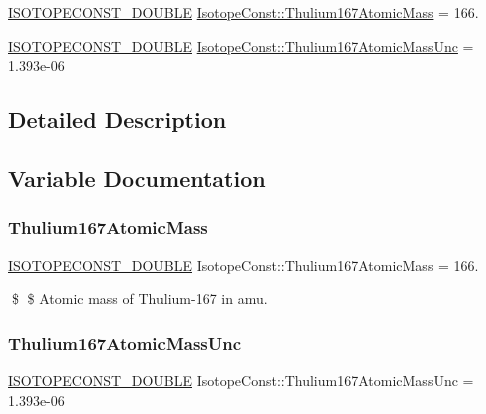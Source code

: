 \begin{DoxyCompactItemize}
\item 
\mbox{\hyperlink{group___isotope_const-_macros_ga8f45a7272ce02c0b4c65c44636ed719a}{I\+S\+O\+T\+O\+P\+E\+C\+O\+N\+S\+T\+\_\+\+D\+O\+U\+B\+LE}} \mbox{\hyperlink{group___isotope_const-_thulium-_tm167_ga1102134452e1325b199676ef048b66ab}{Isotope\+Const\+::\+Thulium167\+Atomic\+Mass}} = 166.
\item 
\mbox{\hyperlink{group___isotope_const-_macros_ga8f45a7272ce02c0b4c65c44636ed719a}{I\+S\+O\+T\+O\+P\+E\+C\+O\+N\+S\+T\+\_\+\+D\+O\+U\+B\+LE}} \mbox{\hyperlink{group___isotope_const-_thulium-_tm167_ga5f30b4ecd3501da8c3ad3e083477f14c}{Isotope\+Const\+::\+Thulium167\+Atomic\+Mass\+Unc}} = 1.\+393e-\/06
\end{DoxyCompactItemize}


\subsection{Detailed Description}


\subsection{Variable Documentation}
\mbox{\label{group___isotope_const-_thulium-_tm167_ga1102134452e1325b199676ef048b66ab}} 
\subsubsection{\texorpdfstring{Thulium167\+Atomic\+Mass}{Thulium167AtomicMass}}
{\footnotesize\ttfamily \mbox{\hyperlink{group___isotope_const-_macros_ga8f45a7272ce02c0b4c65c44636ed719a}{I\+S\+O\+T\+O\+P\+E\+C\+O\+N\+S\+T\+\_\+\+D\+O\+U\+B\+LE}} Isotope\+Const\+::\+Thulium167\+Atomic\+Mass = 166.}

\$ \$ Atomic mass of Thulium-\/167 in amu. \mbox{\label{group___isotope_const-_thulium-_tm167_ga5f30b4ecd3501da8c3ad3e083477f14c}} 
\subsubsection{\texorpdfstring{Thulium167\+Atomic\+Mass\+Unc}{Thulium167AtomicMassUnc}}
{\footnotesize\ttfamily \mbox{\hyperlink{group___isotope_const-_macros_ga8f45a7272ce02c0b4c65c44636ed719a}{I\+S\+O\+T\+O\+P\+E\+C\+O\+N\+S\+T\+\_\+\+D\+O\+U\+B\+LE}} Isotope\+Const\+::\+Thulium167\+Atomic\+Mass\+Unc = 1.\+393e-\/06}

